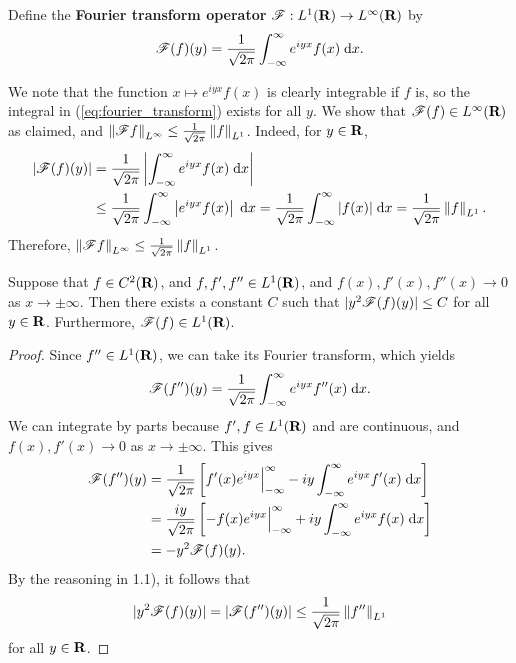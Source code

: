 \documentclass{homework}
\begin{document}
	\maketitle
	
	\question
	Define the \textbf{Fourier transform operator} $\mathscr{F}: L^1(\textnormal{\bf R}) \to L^\infty(\textnormal{\bf R})$ by
	\begin{equation}
		\label{eq:fourier_transform}
		\mathscr{F}(f)(y) = \frac{1}{\sqrt{2\pi}}\int_{-\infty}^\infty e^{iyx}f(x)\;\text{d} x.
	\end{equation}
	
	\begin{arabicparts}
		\questionpart We note that the function $x \mapsto e^{iyx}f(x)$ is clearly integrable if $f$ is, so the integral in (\ref{eq:fourier_transform}) exists for all $y$. We show that $\mathscr{F} (f) \in L^\infty(\textnormal{\bf R})$ as claimed, and $\left\lVert \mathscr{F} f \right\rVert_{L^\infty} \le \frac{1}{\sqrt{2\pi}}\left\lVert f \right\rVert_{L^1}$. Indeed, for $y \in \textnormal{\bf R}$,
		\begin{align}
			|\mathscr{F}(f)(y)| &= \frac{1}{\sqrt{2\pi}}\left|\int_{-\infty}^\infty e^{iyx}f(x)\;\text{d} x\right| \\
			&\le \frac{1}{\sqrt{2\pi}}\int_{-\infty}^\infty \left|e^{iyx}f(x)\right|\;\text{d} x = \frac{1}{\sqrt{2\pi}}\int_{-\infty}^\infty |f(x)|\;\text{d} x = \frac{1}{\sqrt{2\pi}}\left\lVert f \right\rVert_{L^1}.
		\end{align}
		Therefore, $\left\lVert \mathscr{F} f \right\rVert_{L^\infty} \le \frac{1}{\sqrt{2\pi}}\left\lVert f \right\rVert_{L^1}$.
		
		\questionpart Suppose that $f \in C^2(\textnormal{\bf R})$, and $f, f', f'' \in L^1(\textnormal{\bf R})$, and $f(x), f'(x), f''(x)\to 0$ as $x\to\pm\infty$. Then there exists a constant $C$ such that $|y^2\mathscr{F}(f)(y)| \le C$ for all $y \in \textnormal{\bf R}$. Furthermore, $\mathscr{F}(f) \in L^1(\textnormal{\bf R})$.
		
		\begin{proof}
			Since $f'' \in L^1(\textnormal{\bf R})$, we can take its Fourier transform, which yields
			\begin{equation}
				\mathscr{F}(f'')(y) = \frac{1}{\sqrt{2\pi}}\int_{-\infty}^\infty e^{iyx}f''(x)\;\text{d} x.
			\end{equation}
			We can integrate by parts because $f', f\in L^1(\textnormal{\bf R})$ and are continuous, and $f(x), f'(x)\to 0$ as $x \to\pm \infty$. This gives
			\begin{align}
				\mathscr{F}(f'')(y) &= \frac{1}{\sqrt{2\pi}}\left[f'(x)e^{iyx}\Big\vert_{-\infty}^\infty - iy\int_{-\infty}^\infty e^{iyx}f'(x)\;\text{d} x\right]\\
				&= \frac{iy}{\sqrt{2\pi}}\left[-f(x)e^{iyx}\Big\vert_{-\infty}^\infty + iy\int_{-\infty}^\infty e^{iyx}f(x)\;\text{d} x\right] \\
				&= -y^2\mathscr{F}(f)(y).
			\end{align}
			By the reasoning in 1.1), it follows that
			\begin{equation}
				|y^2\mathscr{F} (f)(y)| = |\mathscr{F}(f'')(y)| \le \frac{1}{\sqrt{2\pi}}\left\lVert f'' \right\rVert_{L^1}
			\end{equation}
			for all $y \in \textnormal{\bf R}$.
			

\end{proof}
\end{arabicparts}
\end{document}
